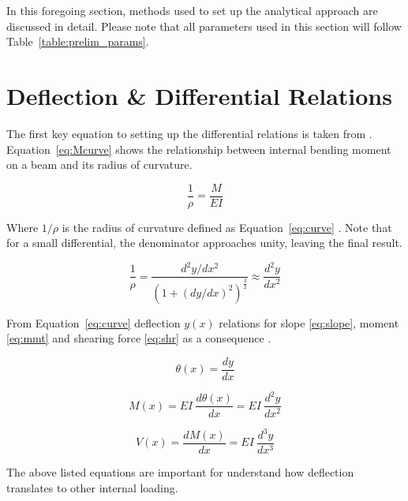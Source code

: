 \label{chapt:prelim}

In this foregoing section, methods used to set up the analytical approach are discussed in detail. Please note that all parameters used in this section will follow Table~\ref{table:prelim_params}.

\section{Deflection \& Differential Relations}

The first key equation to setting up the differential relations is taken from \cite{nisbett2014shigley}. Equation~\ref{eq:Mcurve} shows the relationship between internal bending moment on a beam and its radius of curvature. 

\begin{equation}
	\label{eq:Mcurve}
	\frac{1}{\rho}=\frac{M}{EI}
\end{equation}

Where $1/\rho$ is the radius of curvature defined as Equation~\ref{eq:curve} \cite{nisbett2014shigley}. Note that for a small differential, the denominator approaches unity, leaving the final result.

\begin{equation}
	\label{eq:curve}
	\frac{1}{\rho}=\frac{d^2y/dx^2}{\left( 1 +(dy/dx)^2 \right)^\frac{3}{2}} \approx \frac{d^2y}{dx^2}
\end{equation}

From Equation~\ref{eq:curve} deflection $y(x)$ relations for slope \ref{eq:slope}, moment \ref{eq:mmt} and shearing force \ref{eq:shr} as a consequence \cite{nisbett2014shigley}.

\begin{equation}
	\label{eq:slope}
	\theta(x) = \frac{dy}{dx}
\end{equation}

\begin{equation}
	\label{eq:mmt}
	M(x) = EI\ \frac{d\theta(x)}{dx} = EI\ \frac{d^2y}{dx^2}
\end{equation}

\begin{equation}
	\label{eq:shr}
	V(x) = \frac{dM(x)}{dx} = EI\ \frac{d^3y}{dx^3}
\end{equation}

The above listed equations are important for understand how deflection translates to other internal loading.\\

